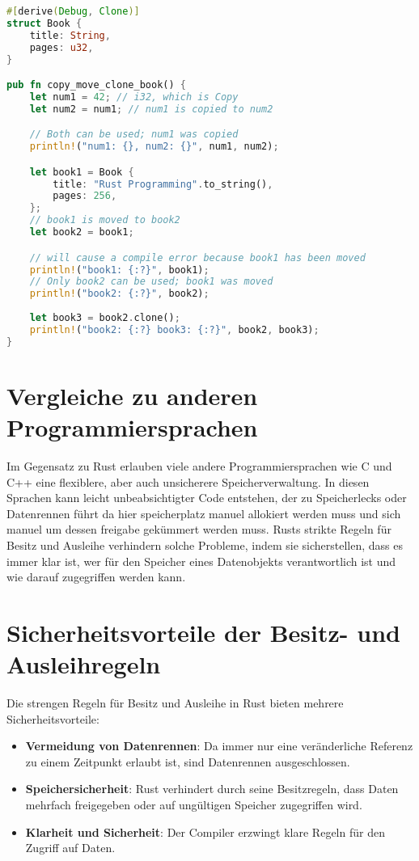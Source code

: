\begin{lstlisting}[language=Rust, caption=Kopieren und Klonen von Strukturen]
#[derive(Debug, Clone)]
struct Book {
    title: String,
    pages: u32,
}

pub fn copy_move_clone_book() {
    let num1 = 42; // i32, which is Copy
    let num2 = num1; // num1 is copied to num2

    // Both can be used; num1 was copied
    println!("num1: {}, num2: {}", num1, num2); 

    let book1 = Book {
        title: "Rust Programming".to_string(),
        pages: 256,
    };
    // book1 is moved to book2
    let book2 = book1; 

    // will cause a compile error because book1 has been moved
    println!("book1: {:?}", book1); 
    // Only book2 can be used; book1 was moved
    println!("book2: {:?}", book2); 
                                    
    let book3 = book2.clone();
    println!("book2: {:?} book3: {:?}", book2, book3);
}
\end{lstlisting}

\section{Vergleiche zu anderen Programmiersprachen}

Im Gegensatz zu Rust erlauben viele andere Programmiersprachen wie C und C++ eine flexiblere, aber auch unsicherere Speicherverwaltung. In diesen Sprachen kann leicht unbeabsichtigter Code entstehen, der zu Speicherlecks oder Datenrennen führt da hier speicherplatz manuel allokiert werden muss und sich manuel um dessen freigabe gekümmert werden muss. Rusts strikte Regeln für Besitz und Ausleihe verhindern solche Probleme, indem sie sicherstellen, dass es immer klar ist, wer für den Speicher eines Datenobjekts verantwortlich ist und wie darauf zugegriffen werden kann.

\section{Sicherheitsvorteile der Besitz- und Ausleihregeln}

Die strengen Regeln für Besitz und Ausleihe in Rust bieten mehrere Sicherheitsvorteile:

\begin{itemize}
    \item \textbf{Vermeidung von Datenrennen}: Da immer nur eine veränderliche Referenz zu einem Zeitpunkt erlaubt ist, sind Datenrennen ausgeschlossen.
    \item \textbf{Speichersicherheit}: Rust verhindert durch seine Besitzregeln, dass Daten mehrfach freigegeben oder auf ungültigen Speicher zugegriffen wird.
    \item \textbf{Klarheit und Sicherheit}: Der Compiler erzwingt klare Regeln für den Zugriff auf Daten.
\end{itemize}

